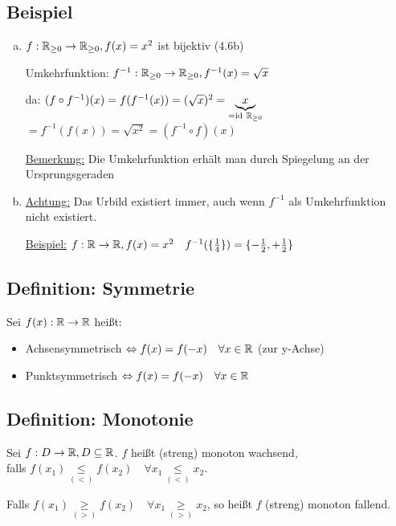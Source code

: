 \documentclass[10pt, a4paper, fleqn]{article}
\begin{document}
    \subsection{Beispiel}
    \begin{enumerate}[a)]
        \item $f: \mathbb{R}_{\geq 0} \to \mathbb{R}_{\geq 0}, f(x) = x^2$ ist bijektiv (4.6b)
        
        Umkehrfunktion: $f^{-1}: \mathbb{R}_{\geq 0} \to \mathbb{R}_{\geq 0}, f^{-1}(x) = \sqrt{x}$

        da: $(f \circ f^{-1})(x) = f(f^{-1}(x)) = (\sqrt{x})^2 = \underbrace{x}_{=\text{id} \ \mathbb{R}_{\geq 0}}$ \\
        $= f^{-1}(f(x)) = \sqrt{x^2} = (f^{-1} \circ f)(x)$

        \underline{Bemerkung:} Die Umkehrfunktion erhält man durch Spiegelung an der Ursprungsgeraden
        \item \underline{Achtung:} Das Urbild existiert immer, auch wenn $f^{-1}$ als Umkehrfunktion nicht existiert.
        
        \underline{Beispiel:} $f: \mathbb{R} \to \mathbb{R}, f(x) = x^2 \quad f^{-1}(\{\frac{1}{4}\}) = \{-\frac{1}{2}, +\frac{1}{2}\}$
    \end{enumerate}

    \subsection{Definition: Symmetrie}
    Sei $f(x): \mathbb{R} \to \mathbb{R}$ heißt:
    \begin{itemize}
        \item Achsensymmetrisch $\Leftrightarrow f(x) = f(-x) \quad \forall x \in \mathbb{R}$ (zur y-Achse)
        \item Punktsymmetrisch $\Leftrightarrow f(x) = f(-x) \quad \forall x \in \mathbb{R}$
    \end{itemize}

    \subsection{Definition: Monotonie}
    Sei $f: D \to \mathbb{R}, D \subseteq \mathbb{R}$. $f$ heißt (streng) monoton wachsend, \\
    falls $f(x_1) \underset{(<)}{\leq} f(x_2) \quad \forall x_1 \underset{(<)}{\leq} x_2$.

    Falls $f(x_1) \underset{(>)}{\geq} f(x_2) \quad \forall x_1 \underset{(>)}{\geq} x_2$,
    so heißt $f$ (streng) monoton fallend.
\end{document}

